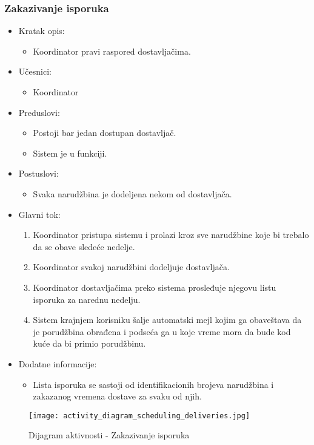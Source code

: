 
\subsubsection{Zakazivanje isporuka}

\begin{itemize}
	\item Kratak opis:
		\begin{itemize}
			\item Koordinator pravi raspored dostavljačima.
		\end{itemize}
	\item Učesnici:
		\begin{itemize}
		    \item Koordinator
		\end{itemize}
	\item Preduslovi:
		\begin{itemize}
		    \item Postoji bar jedan dostupan dostavljač.
		    \item Sistem je u funkciji.
		\end{itemize}
	\item Postuslovi:
		\begin{itemize}
			\item Svaka narudžbina je dodeljena nekom od dostavljača.
	\end{itemize}
	\item Glavni tok:
		\begin{enumerate}
            \item Koordinator pristupa sistemu i prolazi kroz sve narudžbine koje bi trebalo da se obave sledeće nedelje.
           \item Koordinator svakoj narudžbini dodeljuje dostavljača.
            \item Koordinator dostavljačima preko sistema prosleđuje njegovu listu isporuka za narednu nedelju.
            \item Sistem krajnjem korisniku šalje automatski mejl kojim ga obaveštava da je porudžbina obrađena i podseća  ga u koje vreme mora da bude kod kuće da bi primio porudžbinu.
		\end{enumerate}
   \item Dodatne informacije:
        \begin{itemize}
            \item Lista isporuka se sastoji od identifikacionih brojeva narudžbina i zakazanog vremena dostave za svaku od njih. 
        \end{itemize}
\end{itemize}

\begin{figure}[H]
\begin{center}
\texttt{[image: activity\_diagram\_scheduling\_deliveries.jpg]}
\end{center}
    \caption{Dijagram aktivnosti - Zakazivanje isporuka}
\label{fig:Activity_diagram_scheduling_deliveries}
\end{figure}

